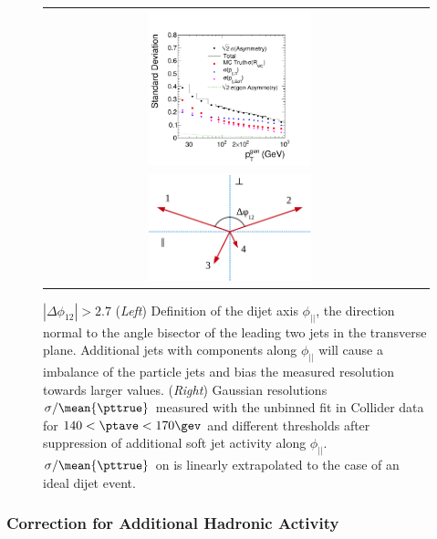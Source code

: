 \begin{figure}[ht]
  \label{fig:ResFit:AddJets:Bias}
  \centering
  \begin{tabular}{cc}
    \includegraphics[width=0.45\textwidth]{figures/Spring10QCDDiJet_ParallelComponent_hParallelContributions}\\
    \includegraphics[width=0.45\textwidth]{figures/Sketch_Projections}
  \end{tabular}
  \caption{\mbox{$|\Delta\phi_{12}| > 2.7$} (\textit{Left}) Definition of the dijet axis $\phi_{||}$, the direction normal to the
    angle bisector of the leading two jets in the transverse plane.
    Additional jets with \pt components along $\phi_{||}$ will cause
    a \pt imbalance of the particle jets and bias the measured
    resolution towards larger values.
    (\textit{Right}) Gaussian resolutions \mbox{$\sigma/\mean{\pttrue}$} measured with the unbinned
    fit in Collider data for \mbox{$140 < \ptave < 170\gev$} and different 
    thresholds after suppression of additional soft jet activity along
    $\phi_{||}$. 
    \mbox{$\sigma/\mean{\pttrue}$} on  is linearly
    extrapolated to the case of an ideal dijet event.
  }
\end{figure}


\subsubsection{Correction for Additional Hadronic Activity}\label{sec:ResFit:AddJets:Extrapolation}



